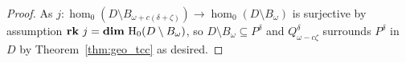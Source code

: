\begin{proof}
  As $j : \hom_0(D\setminus B_{\omega+c(\delta+\zeta)})\to \hom_0(D\setminus B_\omega)$ is surjective by assumption $\mathbf{rk}~j = \mathbf{dim}~\mathrm{H}_0(D\setminus B_\omega)$, so $D\setminus B_\omega\subseteq P^\delta$ and $Q_{\omega-c\zeta}^\delta$ surrounds $P^\delta$ in $D$ by Theorem~\ref{thm:geo_tcc} as desired.

\end{proof}

